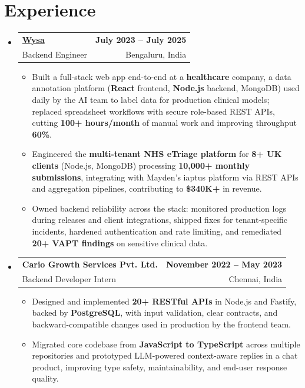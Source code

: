 \documentclass[letterpaper,10pt]{article}
\makeatletter
\newcommand{\resumeItem}[1]{
  \item\small{#1\vspace{-1pt}}
}
\newcommand{\resumeSubheading}[4]{
  \vspace{1pt}\item
    \begin{tabular*}{0.985\textwidth}[t]{l@{\extracolsep{\fill}}r}
      \textbf{#1} & \textbf{\small #2} \\
      {\small\color{ResumeSlate} #3} & {\small\color{ResumeSlate} #4} \\
    \end{tabular*}\vspace{-6pt}
}
\newcommand{\resumeSubHeadingListStart}{\begin{itemize}[leftmargin=0.0in, label={}, itemsep=2pt, topsep=2pt]}
\newcommand{\resumeSubHeadingListEnd}{\end{itemize}}
\newcommand{\resumeItemListStart}{\begin{itemize}[leftmargin=0.18in, itemsep=2pt, topsep=1pt]}
\newcommand{\resumeItemListEnd}{\end{itemize}\vspace{-4pt}}
\makeatother
\begin{document}
\section{Experience}
\resumeSubHeadingListStart
  \resumeSubheading
    {\href{https://www.wysa.io}{Wysa}}{July 2023 -- July 2025}
    {Backend Engineer}{Bengaluru, India}
    \resumeItemListStart
      \resumeItem{Built a full-stack web app end-to-end at a \textbf{healthcare} company, a data annotation platform (\textbf{React} frontend, \textbf{Node.js} backend, MongoDB) used daily by the AI team to label data for production clinical models; replaced spreadsheet workflows with secure role-based REST APIs, cutting \textbf{100+ hours/month} of manual work and improving throughput \textbf{60\%}.}
      \resumeItem{Engineered the \textbf{multi-tenant NHS eTriage platform} for \textbf{8+ UK clients} (Node.js, MongoDB) processing \textbf{10{,}000+ monthly submissions}, integrating with Mayden's iaptus platform via REST APIs and aggregation pipelines, contributing to \textbf{\$340K+} in revenue.}
      \resumeItem{Owned backend reliability across the stack: monitored production logs during releases and client integrations, shipped fixes for tenant-specific incidents, hardened authentication and rate limiting, and remediated \textbf{20+ VAPT findings} on sensitive clinical data.}
    \resumeItemListEnd
  \resumeSubheading
    {Cario Growth Services Pvt. Ltd.}{November 2022 -- May 2023}
    {Backend Developer Intern}{Chennai, India}
    \resumeItemListStart
      \resumeItem{Designed and implemented \textbf{20+ RESTful APIs} in Node.js and Fastify, backed by \textbf{PostgreSQL}, with input validation, clear contracts, and backward-compatible changes used in production by the frontend team.}
      \resumeItem{Migrated core codebase from \textbf{JavaScript to TypeScript} across multiple repositories and prototyped LLM-powered context-aware replies in a chat product, improving type safety, maintainability, and end-user response quality.}
    \resumeItemListEnd
\resumeSubHeadingListEnd
\vspace{-4pt}
\end{document}
